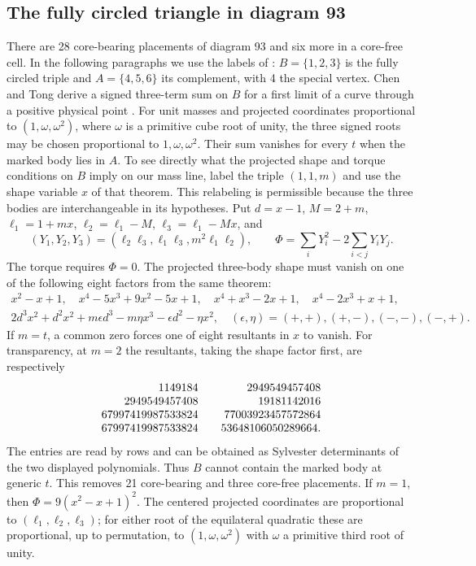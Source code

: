 \documentclass[11pt,letterpaper]{article}
\theoremstyle{definition}
\begin{document}
\subsection{The fully circled triangle in diagram 93}
\label{br-circled}
There are 28 core-bearing placements of diagram 93 and six more in a
core-free cell. In the following paragraphs we use the labels of
\cite[Theorem 6.15]{Tomar}: $B=\{1,2,3\}$ is the fully circled triple
and $A=\{4,5,6\}$ its complement, with 4 the special vertex.
Chen and Tong derive a signed three-term sum on $B$ for a first limit of a curve through a positive physical point \cite[Prop.~5.16, eq.~(109)]{CT}. For unit masses and projected coordinates proportional to $(1,\omega,\omega^2)$, where $\omega$ is a primitive cube root of unity, the three signed roots may be chosen proportional to $1,\omega,\omega^2$. Their sum vanishes for every $t$ when the marked body lies in $A$.
To see directly what the projected shape and torque conditions on $B$
imply on our mass line, label the triple $(1,1,m)$ and use the shape
variable $x$ of that theorem. This relabeling is permissible because
the three bodies are interchangeable in its hypotheses. Put $d=x-1$,
$M=2+m$, $\ell_1=1+mx$, $\ell_2=\ell_1-M$,
$\ell_3=\ell_1-Mx$, and
\[
 (Y_1,Y_2,Y_3)=(\ell_2\ell_3,\ell_1\ell_3,
 m^2\ell_1\ell_2),\qquad
 \Phi=\textstyle\sum_iY_i^2-2\sum_{i<j}Y_iY_j.
\]
The torque requires $\Phi=0$. The projected three-body shape must
vanish on one of the following eight factors from the same theorem:
\[
\begin{gathered}
 x^2-x+1,\quad x^4-5x^3+9x^2-5x+1,\quad
 x^4+x^3-2x+1,\quad x^4-2x^3+x+1,\\
 2d^3x^2+d^2x^2+ m\epsilon d^3-m\eta x^3-\epsilon d^2-\eta x^2,\quad
 (\epsilon,\eta)=(+,+),(+,-),(-,-),(-,+).
\end{gathered}
\]
If $m=t$, a common zero forces one of eight resultants in $x$ to vanish.
For transparency, at $m=2$ the resultants, taking the shape factor
first, are respectively
\[
\begin{array}{r@{\qquad}r}
1149184 & 2949549457408\\
2949549457408 & 19181142016\\
67997419987533824 & 77003923457572864\\
67997419987533824 & 53648106050289664 .
\end{array}
\]
The entries are read by rows and can be obtained as Sylvester
determinants of the two displayed polynomials. Thus $B$ cannot contain
the marked body at generic $t$. This removes 21 core-bearing and three
core-free placements. If $m=1$, then
$\Phi=9(x^2-x+1)^2$. The centered projected coordinates are proportional
to $(\ell_1,\ell_2,\ell_3)$; for either root of the equilateral
quadratic these are proportional, up to permutation, to
$(1,\omega,\omega^2)$ with $\omega$ a primitive third root of unity.
\end{document}
